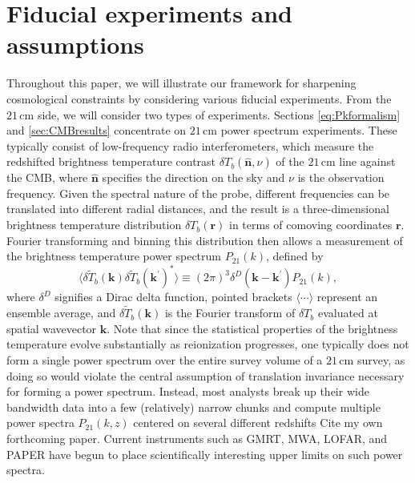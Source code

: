 \documentclass[twocolumn,aps,prd,nofootinbib,showpacs]{revtex4-1}
\begin{document}
\section{Fiducial experiments and assumptions}
\label{sec:fidExpt}

Throughout this paper, we will illustrate our framework for sharpening cosmological constraints by considering various fiducial experiments. From the $21\,\textrm{cm}$ side, we will consider two types of experiments. Sections \ref{eq:Pkformalism} and \ref{sec:CMBresults} concentrate on $21\,\textrm{cm}$ power spectrum experiments. These typically consist of low-frequency radio interferometers, which measure the redshifted brightness temperature contrast $\delta T_b (\mathbf{\hat{n}}, \nu)$ of the $21\,\textrm{cm}$ line against the CMB, where $\mathbf{\hat{n}}$ specifies the direction on the sky and $\nu$ is the observation frequency. Given the spectral nature of the probe, different frequencies can be translated into different radial distances, and the result is a three-dimensional brightness temperature distribution $\delta T_b (\mathbf{r})$ in terms of comoving coordinates $\mathbf{r}$. Fourier transforming and binning this distribution then allows a measurement of the brightness temperature power spectrum $P_\textrm{21} (k)$, defined by
\begin{equation}
\label{eq:PspecDef}
\langle \delta \widetilde{T}_b(\mathbf{k}) \delta \widetilde{T}_b(\mathbf{k}^\prime)^* \rangle \equiv (2\pi)^3 \delta^D (\mathbf{k} - \mathbf{k}^\prime ) P_\textrm{21} (k),
\end{equation}
where $\delta^D$ signifies a Dirac delta function, pointed brackets $\langle \cdots \rangle$ represent an ensemble average, and $ \delta \widetilde{T}_b(\mathbf{k})$ is the Fourier transform of  $\delta T_b$ evaluated at spatial wavevector $\mathbf{k}$. Note that since the statistical properties of the brightness temperature evolve substantially as reionization progresses, one typically does not form a single power spectrum over the entire survey volume of a $21\,\textrm{cm}$ survey, as doing so would violate the central assumption of translation invariance necessary for forming a power spectrum. Instead, most analysts break up their wide bandwidth data into a few (relatively) narrow chunks and compute multiple power spectra $P_\textrm{21} (k,z)$ centered on several different redshifts \acl{Cite my own forthcoming paper}. Current instruments such as GMRT, MWA, LOFAR, and PAPER have begun to place scientifically interesting upper limits on such power spectra.
\end{document}
